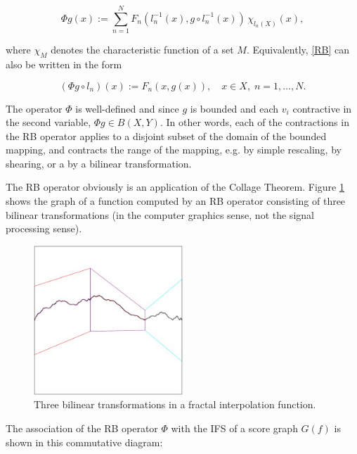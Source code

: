 \documentclass[english,11pt,letterpaper,onecolumn]{scrartcl}
\numberwithin{equation}{section}
\newcommand{\cF}{\mathcal{F}}
\newcommand{\be}{\begin{equation}}
\newcommand{\ee}{\end{equation}}
\begin{document}
\be\label{RB}
\Phi g (x) := \sum\limits_{n=1}^N F_n (l_n^{-1} (x), g\circ l_n^{-1}
(x))\,\chi_{l_n(X)}(x),
\ee

\noindent where $\chi_M$ denotes the characteristic function of a set $M$.
Equivalently, \eqref{RB} can also be written in the form

\be\label{3.3}
(\Phi g \circ l_n) (x) := F_n (x, g(x)),\quad x\in X, \;n = 1, \ldots, N.
\ee

\noindent The operator $\Phi$ is well-defined and since $g$ is bounded and each
$v_i$ contractive in the second variable, $\Phi g\in B(X,Y)$.  In other words,
each of the contractions in the RB operator applies to a disjoint subset of the
domain of the bounded mapping, and contracts the range of the mapping, e.g. by
simple rescaling, by shearing, or a by a bilinear transformation.

The RB operator obviously is an application of the Collage Theorem. Figure
\ref{fig:fif} shows the graph of a function computed by an RB operator
consisting of three bilinear transformations (in the computer graphics sense,
not the signal processing sense).

\begin{figure}
\centerline{\includegraphics[width = 0.5\textwidth]{interp}}
\caption{\label{fig:fif} Three bilinear transformations in
a fractal interpolation function.\protect\footnotemark}
\end{figure}


The association of the RB operator $\Phi$ with the IFS of a score graph
$G(f)$ is shown in this commutative diagram:

\end{document}
